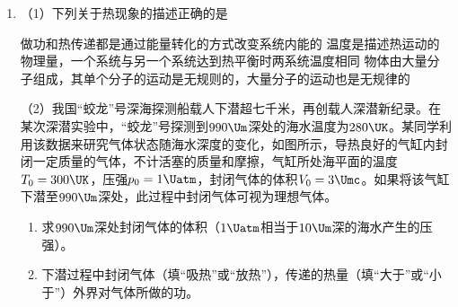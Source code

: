 \documentclass[\gkver]{gaokaozhenti}
\begin{document}
\begin{enumerate}
{$FG=HQ=2R_{2}$，

设粒子相邻两次经过Q点所用的时间为$t$，则有

$t=\frac{FG+HQ+2\pi R_{2}}{v}$，

联立⑦得

$t=(2+\pi)\sqrt{\frac{2md}{qE}}$。

}

\item
（1）下列关于热现象的描述正确的是

{做功和热传递都是通过能量转化的方式改变系统内能的}
{温度是描述热运动的物理量，一个系统与另一个系统达到热平衡时两系统温度相同}
{物体由大量分子组成，其单个分子的运动是无规则的，大量分子的运动也是无规律的}

（2）我国“蛟龙”号深海探测船载人下潜超七千米，再创载人深潜新纪录。在某次深潜实验中，“蛟龙”号探测到$990\Um$深处的海水温度为$280\UK$。某同学利用该数据来研究气体状态随海水深度的变化，如图所示，导热良好的气缸内封闭一定质量的气体，不计活塞的质量和摩擦，气缸所处海平面的温度$T_{0}=300\UK$，压强$p_{0}=1\Uatm$，封闭气体的体积$V_{0}=3\Umc$。如果将该气缸下潜至$990\Um$深处，此过程中封闭气体可视为理想气体。
\begin{enumerate}
	\item
	求$990\Um$深处封闭气体的体积（$1\Uatm$相当于$10\Um$深的海水产生的压强）。
	\item
	下潜过程中封闭气体（填“吸热”或“放热”），传递的热量（填“大于”或“小于”）外界对气体所做的功。
\end{enumerate}


\end{enumerate}
\end{document}

